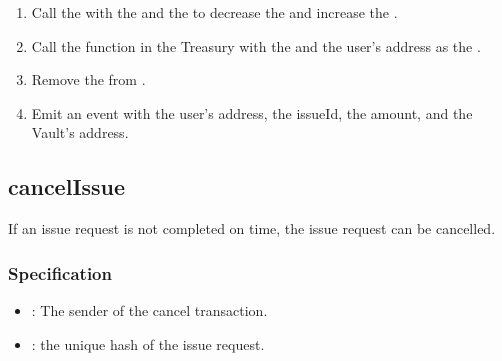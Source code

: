 \documentclass[a4paper,10pt,english]{sphinxmanual}
\begin{document}
\begin{enumerate}
\begin{enumerate}
\end{enumerate}

\item {} 
Call the {\hyperref[\detokenize{spec/vault-registry:issuetokens}]{}} with the  and the  to decrease the  and increase the .

\item {} 
Call the {\hyperref[\detokenize{spec/treasury:mint}]{}} function in the Treasury with the  and the user’s address as the .

\item {} 
Remove the  from .

\item {} 
Emit an  event with the user’s address, the issueId, the amount, and the Vault’s address.

\end{enumerate}


\subsection{cancelIssue}
\label{\detokenize{spec/issue:cancelissue}}\label{\detokenize{spec/issue:id8}}
If an issue request is not completed on time, the issue request can be cancelled.


\subsubsection{Specification}
\label{\detokenize{spec/issue:id9}}


\begin{itemize}
\item {} 
: The sender of the cancel transaction.

\item {} 
: the unique hash of the issue request.

\end{itemize}
\end{document}
